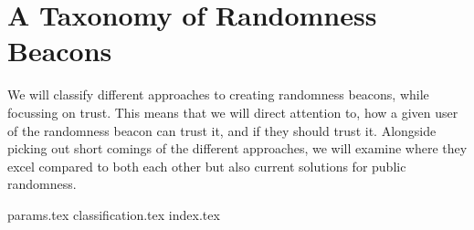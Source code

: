 \section{A Taxonomy of Randomness Beacons}
\label{sec:a_taxonomy_of_randomness_beacons}
We will classify different approaches to creating randomness beacons, while focussing on trust.
This means that we will direct attention to, how a given user of the randomness beacon can trust it, and if they should trust it.
Alongside picking out short comings of the different approaches, we will examine where they excel compared to both each other but also current solutions for public randomness.

{params.tex}
{classification.tex}
{index.tex}
